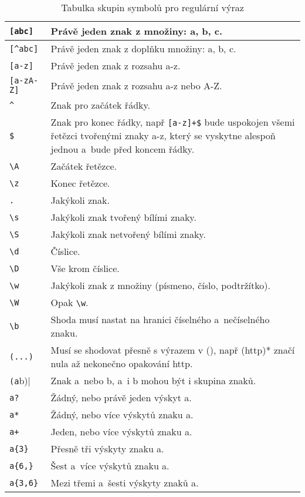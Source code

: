 \begin{table}[h!]
\centering
\begin{tabular}{| m{} | m{} |}
\hline
\verb|[abc]| & Právě jeden znak z množiny: a, b, c. \\
\hline
\verb|[^abc]| & Právě jeden znak z doplňku množiny: a, b, c. \\
\hline
\verb|[a-z]| & Právě jeden znak z rozsahu a-z. \\
\hline
\verb|[a-zA-Z]| & Právě jeden znak z rozsahu a-z nebo A-Z. \\
\hline
\verb|^| & Znak pro začátek řádky. \\
\hline
\verb|$| & Znak pro konec řádky, např \verb|[a-z]+$| bude uspokojen všemi řetězci tvořenými znaky a-z, který se vyskytne alespoň jednou a~bude před koncem řádky. \\
\hline
\verb|\A| & Začátek řetězce. \\
\hline
\verb|\z| & Konec řetězce. \\
\hline
\verb|.| & Jakýkoli znak. \\
\hline
\verb|\s| & Jakýkoli znak tvořený bílími znaky. \\
\hline
\verb|\S| & Jakýkoli znak netvořený bílími znaky. \\
\hline
\verb|\d| & Číslice. \\
\hline
\verb|\D| & Vše krom číslice. \\
\hline
\verb|\w| & Jakýkoli znak z množiny (písmeno, číslo, podtržítko). \\
\hline
\verb|\W| & Opak \verb|\w|. \\
\hline
\verb|\b| & Shoda musí nastat na hranici číselného a~nečíselného znaku. \\
\hline
\verb|(...)| & Musí se shodovat přesně s výrazem v (), např (http)* značí nula až nekonečno opakování http. \\
\hline
\verb|(a|b)| & Znak a~nebo b, a~i b mohou být i skupina znaků. \\
\hline
\verb|a?| & Žádný, nebo právě jeden výskyt a. \\
\hline
\verb|a*| & Žádný, nebo více výskytů znaku a. \\
\hline
\verb|a+| & Jeden, nebo více výskytů znaku a. \\
\hline
\verb|a{3}| & Přesně tři výskyty znaku a. \\
\hline
\verb|a{6,}| & Šest a~více výskytů znaku a. \\
\hline
\verb|a{3,6}| & Mezi třemi a~šesti výskyty znaků a. \\
\hline
\end{tabular}
\caption[Tabulka skupin symbolů pro regulární výraz]{Tabulka skupin symbolů pro regulární výraz}\label{tab:regexpr}
\end{table}

